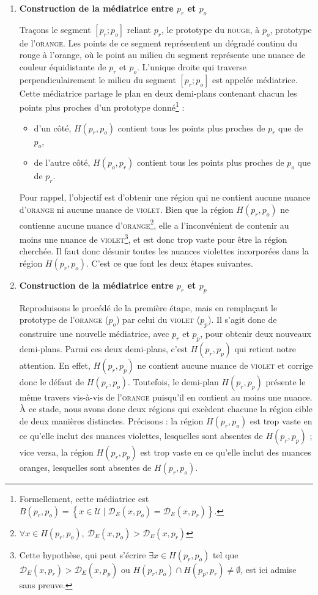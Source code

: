 \documentclass{article}
\begin{document}
\begin{enumerate}[label=\textbf{(\roman*)}]
  \item \textbf{Construction de la médiatrice entre $p_r$ et $p_o$}

  Traçons le segment $[p_r; p_o]$ reliant $p_r$, le prototype du \textsc{rouge}, à $p_o$, prototype de l’\textsc{orange}. Les points de ce segment représentent un dégradé continu du rouge à l'orange, où le point au milieu du segment représente une nuance de couleur équidistante de $p_r$ et $p_o$. L’unique droite qui traverse perpendiculairement le milieu du segment $[p_r; p_o]$ est appelée médiatrice. Cette médiatrice partage le plan en deux demi-plans contenant chacun les points plus proches d’un prototype donné\footnote{Formellement, cette médiatrice est $B(p_r,p_o)=\left\{x\in\mathcal{U} \mid \mathcal{D}_E(x,p_o)=\mathcal{D}_E(x,p_r)\right\}$.} :
\begin{itemize}
    \item d'un côté, $H(p_r,p_o)$ contient tous les points plus proches de $p_r$ que de $p_o$,
    \item de l'autre côté, $H(p_o,p_r)$ contient tous les points plus proches de $p_o$ que de $p_r$.
\end{itemize}
Pour rappel, l’objectif est d’obtenir une région qui ne contient aucune nuance d’\textsc{orange} ni aucune nuance de \textsc{violet}. Bien que la région $H(p_r,p_o)$ ne contienne aucune nuance d’\textsc{orange}\footnote{$\forall x\in H(p_r,p_o),\ \mathcal{D}_E(x,p_o)>\mathcal{D}_E(x,p_r)$}, elle a l’inconvénient de contenir au moins une nuance de \textsc{violet}\footnote{Cette hypothèse, qui peut s’écrire $\exists x\in H(p_r,p_o)$ tel que $\mathcal{D}_E(x,p_r)>\mathcal{D}_E(x,p_p)$ ou $H(p_r,p_o)\cap H(p_p,p_r)\neq\emptyset$, est ici admise sans preuve.}, et est donc trop vaste pour être la région cherchée. Il faut donc désunir toutes les nuances violettes incorporées dans la région $H(p_r,p_o)$. C'est ce que font les deux étapes suivantes.



  \item \textbf{Construction de la médiatrice entre $p_r$ et $p_p$}

Reproduisons le procédé de la première étape, mais en remplaçant le prototype de l’\textsc{orange} ($p_o$) par celui du \textsc{violet} ($p_p$). Il s’agit donc de construire une nouvelle médiatrice, avec $p_r$ et $p_p$, pour obtenir deux nouveaux demi-plans. Parmi ces deux demi-plans, c’est $H(p_r,p_p)$ qui retient notre attention. En effet, $H(p_r,p_p)$ ne contient aucune nuance de \textsc{violet} et corrige donc le défaut de $H(p_r,p_o)$. Toutefois, le demi-plan $H(p_r,p_p)$ présente le même travers vis-à-vis de l'\textsc{orange} puisqu’il en contient au moins une nuance. À ce stade, nous avons donc deux régions qui excèdent chacune la région cible de deux manières distinctes. Précisons : la région $H(p_r,p_o)$ est trop vaste en ce qu’elle inclut des nuances violettes, lesquelles sont absentes de $H(p_r,p_p)$ ; vice versa, la région $H(p_r,p_p)$ est trop vaste en ce qu’elle inclut des nuances oranges, lesquelles sont absentes de $H(p_r,p_o)$.


\end{enumerate}
\end{document}
